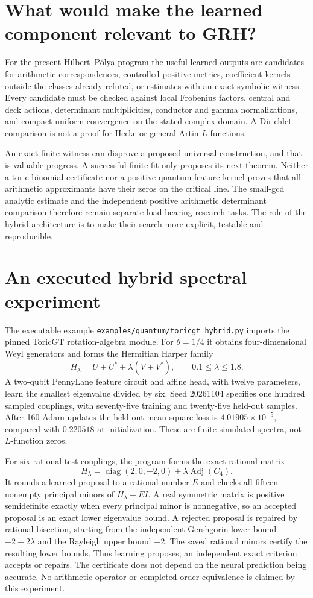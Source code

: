 \documentclass[11pt,oneside,openany]{book}
\theoremstyle{definition}\newtheorem{definition}[theorem]{Definition}
\theoremstyle{remark}\newtheorem{remark}[theorem]{Remark}
\begin{document}
\section{What would make the learned component relevant to GRH?}
For the present Hilbert--P\'olya program the useful learned outputs are
candidates for arithmetic correspondences, controlled positive metrics,
coefficient kernels outside the classes already refuted, or estimates
with an exact symbolic witness. Every candidate must be checked against
local Frobenius factors, central and deck actions, determinant
multiplicities, conductor and gamma normalizations, and compact-uniform
convergence on the stated complex domain. A Dirichlet comparison is not
a proof for Hecke or general Artin $L$-functions.

An exact finite witness can disprove a proposed universal construction,
and that is valuable progress. A successful finite fit only proposes its
next theorem. Neither a toric binomial certificate nor a positive quantum
feature kernel proves that all arithmetic approximants have their zeros
on the critical line. The small-gcd analytic estimate and the independent
positive arithmetic determinant comparison therefore remain separate
load-bearing research tasks. The role of the hybrid architecture is to
make their search more explicit, testable and reproducible.

\section{An executed hybrid spectral experiment}
The executable example \texttt{examples/quantum/toricgt\_hybrid.py} imports the pinned ToricGT rotation-algebra module. For $\theta=1/4$ it obtains four-dimensional Weyl generators and forms the Hermitian Harper family
\[
 H_\lambda=U+U^*+\lambda(V+V^*),\qquad 0.1\le\lambda\le1.8.
\]
A two-qubit PennyLane feature circuit and affine head, with twelve parameters, learn the smallest eigenvalue divided by six. Seed 20261104 specifies one hundred sampled couplings, with seventy-five training and twenty-five held-out samples. After 160 Adam updates the held-out mean-square loss is $4.01905\times10^{-5}$, compared with $0.220518$ at initialization. These are finite simulated spectra, not $L$-function zeros.

For six rational test couplings, the program forms the exact rational matrix
\[
 H_\lambda=\operatorname{diag}(2,0,-2,0)+\lambda\operatorname{Adj}(C_4).
\]
It rounds a learned proposal to a rational number $E$ and checks all fifteen nonempty principal minors of $H_\lambda-EI$. A real symmetric matrix is positive semidefinite exactly when every principal minor is nonnegative, so an accepted proposal is an exact lower eigenvalue bound. A rejected proposal is repaired by rational bisection, starting from the independent Gershgorin lower bound $-2-2\lambda$ and the Rayleigh upper bound $-2$. The saved rational minors certify the resulting lower bounds. Thus learning proposes; an independent exact criterion accepts or repairs. The certificate does not depend on the neural prediction being accurate. No arithmetic operator or completed-order equivalence is claimed by this experiment.
\end{document}
